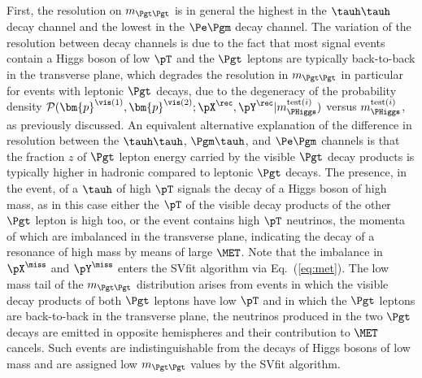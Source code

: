 First, the resolution on $m_{\Pgt\Pgt}$ is in general the highest in the $\tauh\tauh$ decay channel and the
lowest in the $\Pe\Pgm$ decay channel.
The variation of the resolution between decay channels is due to the fact
that most signal events contain a Higgs boson of low
$\pT$ and the $\Pgt$ leptons are typically back-to-back in the
transverse plane, which degrades the resolution in $m_{\Pgt\Pgt}$ in
particular for events with leptonic $\Pgt$ decays,
due to the degeneracy of the probability density
$\mathcal{P}(\bm{p}^{\vis(1)},\bm{p}^{\vis(2)};\pX^{\rec},\pY^{\rec}|m_{\PHiggs}^{\textrm{test}(i)})$
versus $m_{\PHiggs}^{\textrm{test}(i)}$, as previously discussed.
An equivalent alternative explanation of the difference in resolution between the $\tauh\tauh$, $\Pgm\tauh$, and $\Pe\Pgm$ channels
is that the fraction $z$ of $\Pgt$ lepton energy carried by the visible $\Pgt$ decay
products is typically higher in hadronic compared to leptonic $\Pgt$ decays.
The presence, in the event, of a $\tauh$ of high $\pT$ signals the decay of a
Higgs boson of high mass,
as in this case either the $\pT$ of the visible decay products of the
other $\Pgt$ lepton is high too,
or the event contains high $\pT$ neutrinos, the momenta of which are imbalanced in the transverse plane,
indicating the decay of a resonance of high mass by means of large $\MET$.
Note that the imbalance in $\pX^{\miss}$ and $\pY^{\miss}$ enters the
SVfit algorithm via Eq.~(\ref{eq:met}).
The low mass tail of the $m_{\Pgt\Pgt}$ distribution arises from
events in which the visible decay products of both $\Pgt$ leptons have
low $\pT$ and in which the $\Pgt$ leptons are back-to-back in the
transverse plane, the neutrinos produced in the two
$\Pgt$ decays are emitted in opposite hemispheres and their contribution to $\MET$ cancels.
Such events are indistinguishable from the decays of Higgs bosons of low mass
and are assigned low $m_{\Pgt\Pgt}$ values by the SVfit algorithm.

